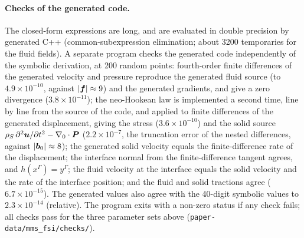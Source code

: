 \paragraph{Checks of the generated code.}
The closed-form expressions are long, and are evaluated in double precision by generated C++ (common-subexpression elimination; about 3200 temporaries for the fluid fields).
A separate program checks the generated code independently of the symbolic derivation, at 200 random points: fourth-order finite differences of the generated velocity and pressure reproduce the generated fluid source (to $4.9\times10^{-10}$, against $|\boldsymbol{f}| \approx 9$) and the generated gradients, and give a zero divergence ($3.8\times10^{-11}$); the neo-Hookean law is implemented a second time, line by line from the source of the code, and applied to finite differences of the generated displacement, giving the stress ($3.6\times10^{-10}$) and the solid source $\rho_S\,\partial^2\boldsymbol{u}/\partial t^2 - \nabla_0\cdot\boldsymbol{P}$ ($2.2\times10^{-7}$, the truncation error of the nested differences, against $|\boldsymbol{b}_0| \approx 8$); the generated solid velocity equals the finite-difference rate of the displacement; the interface normal from the finite-difference tangent agrees, and $h(x^\Gamma) = y^\Gamma$; the fluid velocity at the interface equals the solid velocity and the rate of the interface position; and the fluid and solid tractions agree ($6.7\times10^{-15}$).
The generated values also agree with the 40-digit symbolic values to $2.3\times10^{-14}$ (relative).
The program exits with a non-zero status if any check fails; all checks pass for the three parameter sets above (\texttt{paper-data/mms\_fsi/checks/}).
